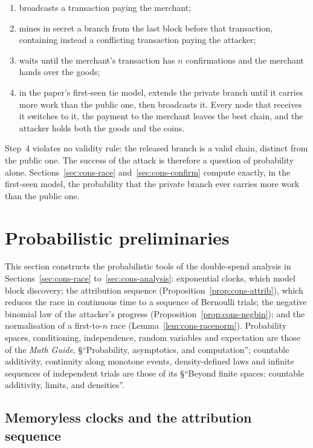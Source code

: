 \documentclass[11pt,a4paper]{article}
\theoremstyle{definition}
\begin{document}
\begin{enumerate}[itemsep=1pt]
\item broadcasts a transaction paying the merchant;
\item mines in secret a branch from the last block before that transaction,
  containing instead a conflicting transaction paying the attacker;
\item waits until the merchant's transaction has $n$ confirmations and the
  merchant hands over the goods;
\item in the paper's first-seen tie model, extends the private branch until it
  carries more work than the public one, then broadcasts it. Every node that
  receives it switches to it, the payment to the merchant leaves the best
  chain, and the attacker holds both the goods and the coins.
\end{enumerate}

Step~4 violates no validity rule: the released branch is a valid chain,
distinct from the public one. The success of the attack is therefore a
question of probability alone. Sections~\ref{sec:cons-race}
and~\ref{sec:cons-confirm} compute exactly, in the first-seen model, the
probability that the private branch ever carries more work than the public
one.

\section{Probabilistic preliminaries}\label{sec:cons-toolkit}

This section constructs the probabilistic tools of the double-spend
analysis in Sections~\ref{sec:cons-race} to~\ref{sec:cons-analysis}:
exponential clocks, which model block discovery; the attribution
sequence (Proposition~\ref{prop:cons-attrib}), which reduces the race in
continuous time to a sequence of Bernoulli trials; the negative binomial
law of the attacker's progress (Proposition~\ref{prop:cons-negbin}); and
the normalisation of a first-to-$n$ race
(Lemma~\ref{lem:cons-racenorm}). Probability spaces, conditioning,
independence, random variables and expectation are those of the
\emph{Math Guide}, \S``Probability, asymptotics, and computation'';
countable additivity, continuity along monotone events, density-defined
laws and infinite sequences of independent trials are those of its
\S``Beyond finite spaces: countable additivity, limits, and densities''.

\subsection{Memoryless clocks and the attribution
sequence}\label{sec:cons-clocks}
\end{document}

